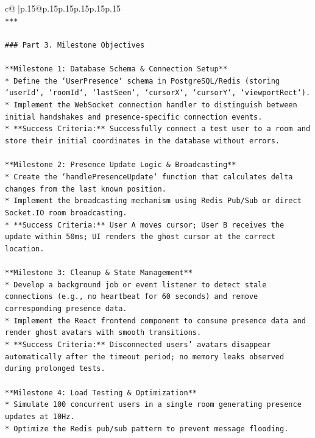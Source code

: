 \documentclass{article}
\begin{document}
{\begin{supertabular}{c@{$\;$}|p{.15\linewidth}@{}p{.15\linewidth}p{.15\linewidth}p{.15\linewidth}p{.15\linewidth}p{.15\linewidth}}
{{{\\ 
\texttt{***} \\
\\ 
\texttt{\#\#\# Part 3. Milestone Objectives} \\
\\ 
\texttt{**Milestone 1: Database Schema \& Connection Setup**} \\
\texttt{*   Define the `UserPresence` schema in PostgreSQL/Redis (storing `userId`, `roomId`, `lastSeen`, `cursorX`, `cursorY`, `viewportRect`).} \\
\texttt{*   Implement the WebSocket connection handler to distinguish between initial handshakes and presence{-}specific connection events.} \\
\texttt{*   **Success Criteria:** Successfully connect a test user to a room and store their initial coordinates in the database without errors.} \\
\\ 
\texttt{**Milestone 2: Presence Update Logic \& Broadcasting**} \\
\texttt{*   Create the `handlePresenceUpdate` function that calculates delta changes from the last known position.} \\
\texttt{*   Implement the broadcasting mechanism using Redis Pub/Sub or direct Socket.IO room broadcasting.} \\
\texttt{*   **Success Criteria:** User A moves cursor; User B receives the update within 50ms; UI renders the ghost cursor at the correct location.} \\
\\ 
\texttt{**Milestone 3: Cleanup \& State Management**} \\
\texttt{*   Develop a background job or event listener to detect stale connections (e.g., no heartbeat for 60 seconds) and remove corresponding presence data.} \\
\texttt{*   Implement the React frontend component to consume presence data and render ghost avatars with smooth transitions.} \\
\texttt{*   **Success Criteria:** Disconnected users' avatars disappear automatically after the timeout period; no memory leaks observed during prolonged tests.} \\
\\ 
\texttt{**Milestone 4: Load Testing \& Optimization**} \\
\texttt{*   Simulate 100 concurrent users in a single room generating presence updates at 10Hz.} \\
\texttt{*   Optimize the Redis pub/sub pattern to prevent message flooding.} \\
}}}
\end{supertabular}}
\end{document}
